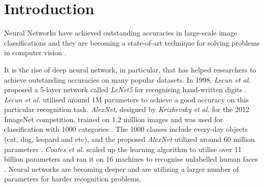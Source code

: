 \documentclass[a4paper,12pt]{report}
\begin{document}
\pagestyle{empty}
\singlespacing

\onehalfspacing

\singlespacing


\setcounter{page}{0}
\pagestyle{plain}
\tableofcontents
\listoffigures
\listoftables

\onehalfspacing


\chapter{Introduction}
\setcounter{page}{1}

Neural Networks have achieved outstanding accuracies in large-scale
image classifications and they are becoming a state-of-art technique for
solving problems in computer vision  \cite{Krizhevsky,Lecun1998gradient,
Szegedy}.

It is the rise of deep neural network, in particular, that has helped researchers
to achieve outstanding accuracies on many popular datasets.
In 1998, \textit{Lecun et al.} proposed a 5-layer network called \textit{LeNet5}
for recognising hand-written digits \cite{Lecun1998gradient}.
\textit{Lecun et al.} utilised around 1M parameters to achieve a good accuracy on
this particular recognition task.
\textit{AlexNet}, designed by \textit{Krizhevsky et al.} for the 2012 ImageNet
competition, trained on 1.2 million images
and was used for classification with $1000$ categories \cite{Krizhevsky}.
The $1000$ classes include every-day objects (cat, dog, leopard and etc), and the proposed
\textit{AlexNet} utilized around 60 million parameters \cite{Krizhevsky}.
\textit{Coates et al.} scaled up the learning algorithm to utilise over
11 billion parameters and ran it on 16 machines to recognise unlabelled human
faces \cite{Coates}.
Neural networks are becoming deeper and are utilizing a larger number of parameters
for harder recognition problems.
\end{document}
